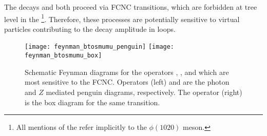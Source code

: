 
The decays \btokpipimumu and \btophikmumu both proceed via \decay{\bquark}{\squark\mumu} FCNC
transitions, which are forbidden at tree level in the \sm\footnote{All mentions of the \phii
  refer implicitly to the $\phi(1020)$ meson.
}.
Therefore, these processes are potentially sensitive to virtual \np particles contributing
to the decay amplitude in loops.



\begin{figure}
  \begin{center}
    \texttt{[image: feynman\_btosmumu\_penguin]}
    \texttt{[image: feynman\_btosmumu\_box]}
    \caption[Schematic Feynman diagrams for loop and box diagrams]
    {\small
      Schematic Feynman diagrams for the operators , , and  which are most sensitive
      to the \decay{\bquark}{\squark\mumu} FCNC.
      Operators (left)  and  are the photon and $Z$ mediated penguin diagrams, respectively.
      The operator  (right) is the box diagram for the same transition.
    }
    \label{fig:hhh:loops}
  \end{center}
\end{figure}

